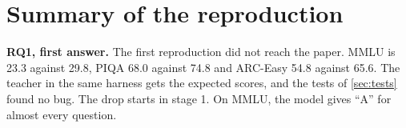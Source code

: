 \section{Summary of the reproduction}
\label{sec:repro-summary}

\begin{finding}
\textbf{RQ1, first answer.} The first reproduction did not reach the paper. MMLU is 23.3 against 29.8, PIQA 68.0 against 74.8 and ARC-Easy 54.8 against 65.6. The teacher in the same harness gets the expected scores, and the tests of \cref{sec:tests} found no bug. The drop starts in stage 1. On MMLU, the model gives \enquote{A} for almost every question.
\end{finding}

